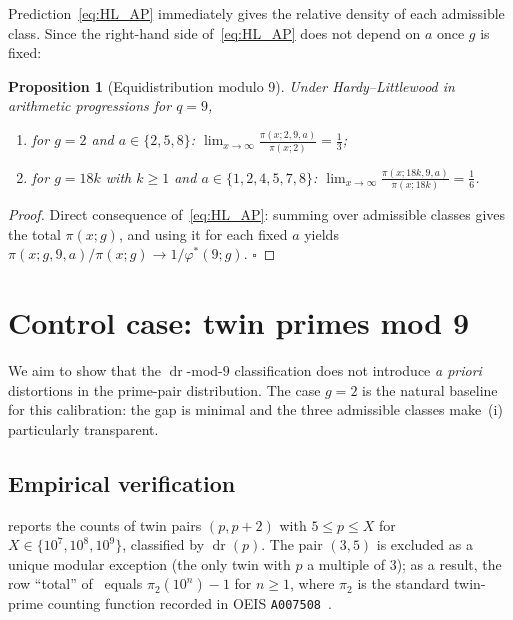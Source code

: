 \documentclass[11pt]{amsart}
\theoremstyle{plain}
\newtheorem{proposition}[theorem]{Proposition}
\theoremstyle{definition}
\theoremstyle{remark}
\DeclareMathOperator{\dr}{dr}
\begin{document}
Prediction~\eqref{eq:HL_AP} immediately gives the relative density of
each admissible class. Since the right-hand side
of~\eqref{eq:HL_AP} does not depend on $a$ once $g$ is fixed:

\begin{proposition}[Equidistribution modulo 9]\label{prop:equipart}
Under Hardy--Littlewood in arithmetic progressions for $q=9$,
\begin{enumerate}
\item for $g=2$ and $a \in \{2,5,8\}$:
$\displaystyle\lim_{x\to\infty}\frac{\pi(x;2,9,a)}{\pi(x;2)} = \frac{1}{3}$;
\item for $g=18k$ with $k \ge 1$ and $a \in \{1,2,4,5,7,8\}$:
$\displaystyle\lim_{x\to\infty}\frac{\pi(x;18k,9,a)}{\pi(x;18k)} = \frac{1}{6}$.
\end{enumerate}
\end{proposition}

\begin{proof}
Direct consequence of~\eqref{eq:HL_AP}: summing over admissible classes
gives the total $\pi(x;g)$, and using it for each fixed $a$ yields
$\pi(x;g,9,a)/\pi(x;g) \to 1/\varphi^*(9;g)$. $\square$
\end{proof}

\section{Control case: twin primes mod 9}\label{sec:twins}

We aim to show that the $\dr$-mod-$9$ classification does not introduce
\emph{a priori} distortions in the prime-pair distribution. The case
$g=2$ is the natural baseline for this calibration: the gap is minimal
and the three admissible classes make
\,(i) particularly transparent.

\subsection{Empirical verification}

 reports the counts of twin pairs $(p,p+2)$ with
$5 \le p \le X$ for $X \in \{10^7, 10^8, 10^9\}$, classified by
$\dr(p)$. The pair $(3,5)$ is excluded as a unique modular exception
(the only twin with $p$ a multiple of $3$); as a result, the row
``total'' of~ equals $\pi_2(10^n) - 1$ for $n \ge 1$,
where $\pi_2$ is the standard twin-prime counting function recorded in
OEIS \texttt{A007508}~\cite{OEISA007508}.
\end{document}
